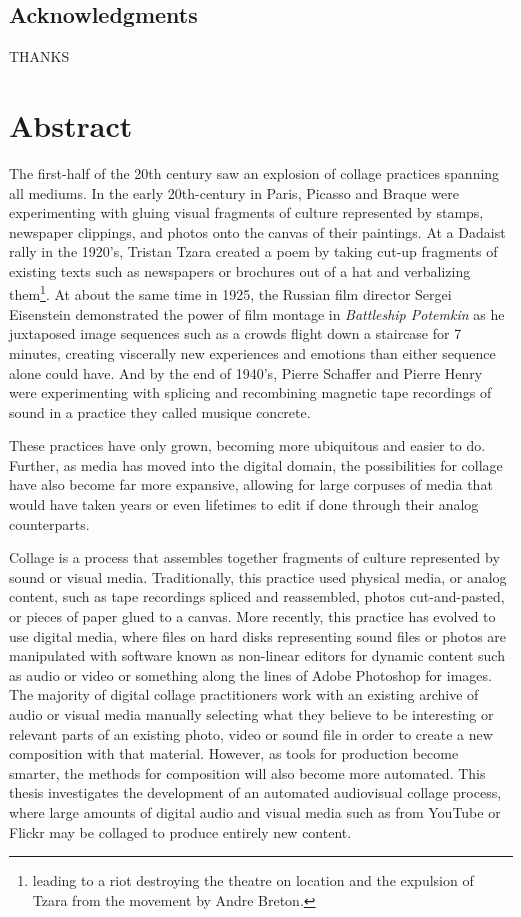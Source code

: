 \documentclass[a4paper,11pt,twoside]{ThesisStyle}
\begin{document}

\dominitoc
{}
 \cleardoublepage
\section*{Acknowledgments}
THANKS

\tableofcontents
\mainmatter

\cleardoublepage
\chapter*{Abstract}
The first-half of the 20th century saw an explosion of collage practices spanning all mediums.  In the early 20th-century in Paris, Picasso and Braque were experimenting with gluing visual fragments of culture represented by stamps, newspaper clippings, and photos onto the canvas of their paintings.  At a Dadaist rally in the 1920's, Tristan Tzara created a poem by taking cut-up fragments of existing texts such as newspapers or brochures out of a hat and verbalizing them\footnote{leading to a riot destroying the theatre on location and the expulsion of Tzara from the movement by Andre Breton.}.  At about the same time in 1925, the Russian film director Sergei Eisenstein demonstrated the power of film montage in \textit{Battleship Potemkin} as he juxtaposed image sequences such as a crowds flight down a staircase for 7 minutes, creating viscerally new experiences and emotions than either sequence alone could have.  And by the end of 1940's, Pierre Schaffer and Pierre Henry were experimenting with splicing and recombining magnetic tape recordings of sound in a practice they called musique concrete.  

These practices have only grown, becoming more ubiquitous and easier to do.  Further, as media has moved into the digital domain, the possibilities for collage have also become far more expansive, allowing for large corpuses of media that would have taken years or even lifetimes to edit if done through their analog counterparts.  


Collage is a process that assembles together fragments of culture represented by sound or visual media.  Traditionally, this practice used physical media, or analog content, such as tape recordings spliced and reassembled, photos cut-and-pasted, or pieces of paper glued to a canvas.  More recently, this practice has evolved to use digital media, where files on hard disks representing sound files or photos are manipulated with software known as non-linear editors for dynamic content such as audio or video or something along the lines of Adobe Photoshop\textsuperscript{\textregistered} for images.  The majority of digital collage practitioners work with an existing archive of audio or visual media manually selecting what they believe to be interesting or relevant parts of an existing photo, video or sound file in order to create a new composition with that material.  However, as tools for production become smarter, the methods for composition will also become more automated.  This thesis investigates the development of an automated audiovisual collage process, where large amounts of digital audio and visual media such as from YouTube or Flickr may be collaged to produce entirely new content.
\end{document}
